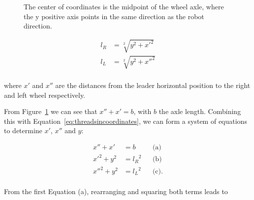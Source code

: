 \documentclass[journal]{IEEEtran}
\begin{document}
\begin{figure}[]

\caption{The center of coordinates is the midpoint of the wheel axle, where the y positive axis points in the same direction as the robot direction.}
\label{fig:dibujitos}
\end{figure}{}

\begin{equation}
\begin{array}{ll}  
l_R &= \sqrt[2]{y^2 + {x'}^2} \\
l_L &= \sqrt[2]{y^2 + {x''}^2} \\
\end{array}
\label{eq:threadsincoordinates}
\end{equation}

\noindent where $x'$ and $x''$ are the distances from the leader horizontal position to the right and left wheel respectively.

From Figure~\ref{fig:dibujitos} we can see that ${x''} + x' =  b$, with $b$ the axle length. Combining this with Equation~\ref{eq:threadsincoordinates}, we can form a system of equations to determine $x'$, $x''$ and $y$:

\begin{align*}
{x''} + x'					&=  b &&\text{(a)}  \\
{x'}^2 +  y^2                &= {l_R}^2 &&\text{(b)} \\
{x''}^2 + y^2                &= {l_L}^2  &&\text{(c)}. \\
\end{align*}

From the first Equation (a), rearranging and squaring both terms leads to
\end{document}
